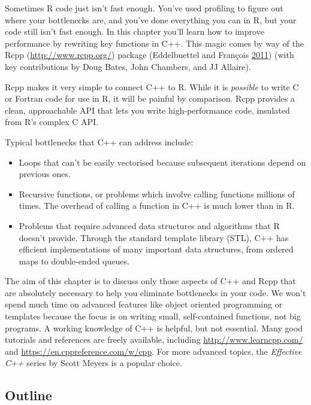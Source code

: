 \documentclass[]{book}
\renewcommand{\href}[2]{#2 (\url{#1})}
\begin{document}
Sometimes R code just isn't fast enough. You've used profiling to figure out where your bottlenecks are, and you've done everything you can in R, but your code still isn't fast enough. In this chapter you'll learn how to improve performance by rewriting key functions in C++. This magic comes by way of the \href{http://www.rcpp.org/}{Rcpp} package (Eddelbuettel and François \protect\hyperlink{ref-Rcpp}{2011}) (with key contributions by Doug Bates, John Chambers, and JJ Allaire).

Rcpp makes it very simple to connect C++ to R. While it is \emph{possible} to write C or Fortran code for use in R, it will be painful by comparison. Rcpp provides a clean, approachable API that lets you write high-performance code, insulated from R's complex C API.  

Typical bottlenecks that C++ can address include:

\begin{itemize}
\item
  Loops that can't be easily vectorised because subsequent iterations depend
  on previous ones.
\item
  Recursive functions, or problems which involve calling functions millions of
  times. The overhead of calling a function in C++ is much lower than in R.
\item
  Problems that require advanced data structures and algorithms that R doesn't
  provide. Through the standard template library (STL), C++ has efficient
  implementations of many important data structures, from ordered maps to
  double-ended queues.
\end{itemize}

The aim of this chapter is to discuss only those aspects of C++ and Rcpp that are absolutely necessary to help you eliminate bottlenecks in your code. We won't spend much time on advanced features like object oriented programming or templates because the focus is on writing small, self-contained functions, not big programs. A working knowledge of C++ is helpful, but not essential. Many good tutorials and references are freely available, including \url{http://www.learncpp.com/} and \url{https://en.cppreference.com/w/cpp}. For more advanced topics, the \emph{Effective C++} series by Scott Meyers is a popular choice.

\hypertarget{outline-8}{%
\subsection*{Outline}\label{outline-8}}
\end{document}
